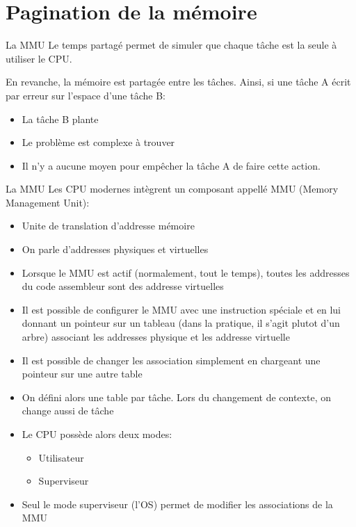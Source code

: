 \section{Pagination de la mémoire}

\begin{frame}{La MMU}
  Le temps partagé  permet de simuler que chaque tâche  est la seule à
  utiliser le CPU.

  En revanche, la mémoire est partagée entre les tâches. Ainsi, si une
  tâche A écrit par erreur sur l'espace d'une tâche B:
  \begin{itemize} 
  \item  La tâche B plante
  \item  Le problème est complexe à trouver
  \item Il  n'y a  aucune moyen  pour empêcher la  tâche A  de faire
    cette action.
  \end{itemize} 
\end{frame}

\begin{frame}{La MMU}  
  Les  CPU  modernes  intègrent   un  composant  appellé  MMU  (Memory
  Management Unit):
  \begin{itemize}
  \item  Unite de translation d'addresse mémoire
  \item  On parle d'addresses physiques et virtuelles
  \item Lorsque le MMU est  actif (normalement, tout le temps), toutes
    les addresses du code assembleur sont des addresse virtuelles
  \item  Il est  possible de  configurer le  MMU avec  une instruction
    spéciale et  en lui  donnant un pointeur  sur un tableau  (dans la
    pratique,  il s'agit  plutot d'un  arbre) associant  les addresses
    physique et les addresse virtuelle
  \item  Il est  possible  de changer  les  association simplement  en
    chargeant une pointeur sur une autre table
  \item On  défini alors une table  par tâche.  Lors  du changement de
    contexte, on change aussi de tâche
  \item Le CPU possède alors deux modes:
    \begin{itemize}
    \item  Utilisateur
    \item  Superviseur
    \end{itemize} 
  \item  Seul  le  mode  superviseur  (l'OS) permet  de  modifier  les
    associations de la MMU
  \end{itemize}
\end{frame} 


